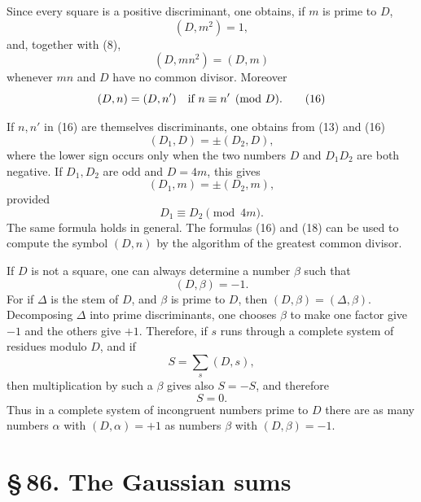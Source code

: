 \documentclass[11pt]{article}
\begin{document}
Since every square is a positive discriminant, one obtains, if \(m\) is prime to \(D\),
\begin{equation}
        (D,m^2)=1,
\tag{14}
\end{equation}
and, together with (8),
\begin{equation}
        (D,mn^2)=(D,m)
\tag{15}
\end{equation}
whenever \(mn\) and \(D\) have no common divisor.  Moreover
\begin{equation}
        (D,n)=(D,n')\quad\hbox{if }n\equiv n'\pmod D.
\tag{16}
\end{equation}

If \(n,n'\) in (16) are themselves discriminants, one obtains from (13) and (16)
\begin{equation}
        (D_1,D)=\pm(D_2,D),
\tag{17}
\end{equation}
where the lower sign occurs only when the two numbers \(D\) and \(D_1D_2\) are both negative.  If \(D_1,D_2\) are odd and \(D=4m\), this gives
\begin{equation}
        (D_1,m)=\pm(D_2,m),
\tag{18}
\end{equation}
provided
\begin{equation}
        D_1\equiv D_2\pmod {4m}.
\tag{19}
\end{equation}
The same formula holds in general.  The formulas (16) and (18) can be used to compute the symbol \((D,n)\) by the algorithm of the greatest common divisor.

If \(D\) is not a square, one can always determine a number \(\beta\) such that
\begin{equation}
        (D,\beta)=-1.
\tag{21}
\end{equation}
For if \(\Delta\) is the stem of \(D\), and \(\beta\) is prime to \(D\), then \((D,\beta)=(\Delta,\beta)\).  Decomposing \(\Delta\) into prime discriminants, one chooses \(\beta\) to make one factor give \(-1\) and the others give \(+1\).  Therefore, if \(s\) runs through a complete system of residues modulo \(D\), and if
\[
        S=\sum_s (D,s),
\]
then multiplication by such a \(\beta\) gives also \(S=-S\), and therefore
\begin{equation}
        S=0.
\tag{22}
\end{equation}
Thus in a complete system of incongruent numbers prime to \(D\) there are as many numbers \(\alpha\) with \((D,\alpha)=+1\) as numbers \(\beta\) with \((D,\beta)=-1\).

\section*{\S\,86. The Gaussian sums}
\end{document}
